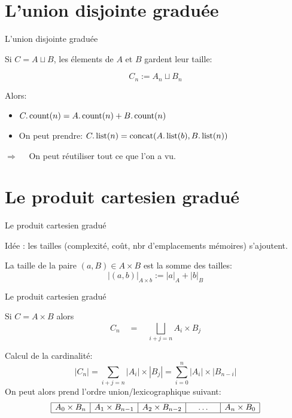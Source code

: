 \documentclass{beamer}
\begin{document}
\section{L'union disjointe graduée}
\begin{frame}{L'union disjointe graduée}

  Si $C = A \sqcup B$, les élements de $A$ et $B$ gardent leur taille:

  \[C_n := A_n \sqcup B_n\]

  Alors:
  \begin{itemize}
  \item $C.\operatorname{count}(n) = A.\operatorname{count}(n) + B.\operatorname{count}(n)$
  \item On peut prendre: $C.\operatorname{list}(n) = \operatorname{concat}(A.\operatorname{list}(b), B.\operatorname{list}(n))$
  \end{itemize}
  \bigskip\pause

  $\Longrightarrow\quad$ On peut réutiliser tout ce que l'on a vu.
\end{frame}

\section{Le produit cartesien gradué}
\begin{frame}{Le produit cartesien gradué}

  Idée : les tailles (complexité, coût, nbr d'emplacements mémoires) s'ajoutent.
  \begin{definition}
    La taille de la paire $(a, B)\in A\times B$ est la somme des tailles:
    \[|(a, b)|_{A\times b} := |a|_A + |b|_B\]
  \end{definition}
\end{frame}

\begin{frame}{Le produit cartesien gradué}

  \begin{NOTE}
    Si $C = A \times B$ alors
    \[
    C_n\quad=\quad\bigsqcup_{i+j=n}  A_i \times B_j
    \]
  \end{NOTE}
  \bigskip\pause

  Calcul de la cardinalité:
  \[
  |C_n| = \sum_{i+j=n}  |A_i| \times |B_j| = 
          \sum_{i=0}^{n}  |A_i| \times |B_{n-i}|
  \]
  On peut alors prend l'ordre union/lexicographique suivant:
  \[
  \begin{array}{|c|c|c|c|c|c|}
    \hline
    A_0\times B_n &     A_1\times B_{n-1} &  A_2\times B_{n-2} &  
    \quad\dots\quad &
    A_{n}\times B_{0}
    \\ \hline
  \end{array}
  \]

\end{frame}
\end{document}
